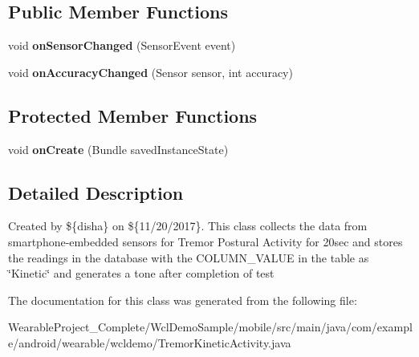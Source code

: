 \subsection*{Public Member Functions}
\begin{DoxyCompactItemize}
\item 
void {\bfseries on\+Sensor\+Changed} (Sensor\+Event event)\hypertarget{classcom_1_1example_1_1android_1_1wearable_1_1wcldemo_1_1TremorKineticActivity_a69319643549ff4dccbfdd539e629a10f}{}\label{classcom_1_1example_1_1android_1_1wearable_1_1wcldemo_1_1TremorKineticActivity_a69319643549ff4dccbfdd539e629a10f}

\item 
void {\bfseries on\+Accuracy\+Changed} (Sensor sensor, int accuracy)\hypertarget{classcom_1_1example_1_1android_1_1wearable_1_1wcldemo_1_1TremorKineticActivity_aaec5829c3d76d1a0921721cabff36cdd}{}\label{classcom_1_1example_1_1android_1_1wearable_1_1wcldemo_1_1TremorKineticActivity_aaec5829c3d76d1a0921721cabff36cdd}

\end{DoxyCompactItemize}
\subsection*{Protected Member Functions}
\begin{DoxyCompactItemize}
\item 
void {\bfseries on\+Create} (Bundle saved\+Instance\+State)\hypertarget{classcom_1_1example_1_1android_1_1wearable_1_1wcldemo_1_1TremorKineticActivity_a2c61585006d34bdad4a252c74a5aee63}{}\label{classcom_1_1example_1_1android_1_1wearable_1_1wcldemo_1_1TremorKineticActivity_a2c61585006d34bdad4a252c74a5aee63}

\end{DoxyCompactItemize}


\subsection{Detailed Description}
Created by \$\{disha\} on \$\{11/20/2017\}. This class collects the data from smartphone-\/embedded sensors for Tremor Postural Activity for 20sec and stores the readings in the database with the C\+O\+L\+U\+M\+N\+\_\+\+V\+A\+L\+UE in the table as \char`\"{}\+Kinetic\char`\"{} and generates a tone after completion of test 

The documentation for this class was generated from the following file\+:\begin{DoxyCompactItemize}
\item 
Wearable\+Project\+\_\+\+Complete/\+Wcl\+Demo\+Sample/mobile/src/main/java/com/example/android/wearable/wcldemo/Tremor\+Kinetic\+Activity.\+java\end{DoxyCompactItemize}
